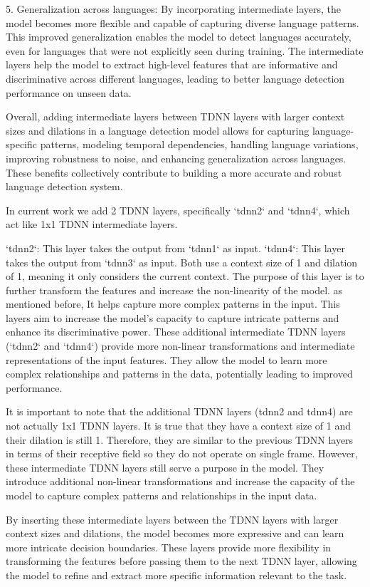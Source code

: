 \documentclass[a4paper]{article}
\begin{document}
5. Generalization across languages: By incorporating intermediate layers, the model becomes more flexible and capable of capturing diverse language patterns. This improved generalization enables the model to detect languages accurately, even for languages that were not explicitly seen during training. The intermediate layers help the model to extract high-level features that are informative and discriminative across different languages, leading to better language detection performance on unseen data.

Overall, adding intermediate layers between TDNN layers with larger context sizes and dilations in a language detection model allows for capturing language-specific patterns, modeling temporal dependencies, handling language variations, improving robustness to noise, and enhancing generalization across languages. These benefits collectively contribute to building a more accurate and robust language detection system.

In current work we add 2 TDNN layers, specifically `tdnn2` and `tdnn4`, which act like 1x1 TDNN intermediate layers.

`tdnn2`: This layer takes the output from `tdnn1` as input. `tdnn4`: This layer takes the output from `tdnn3` as input. Both use a context size of 1 and dilation of 1, meaning it only considers the current context. The purpose of this layer is to further transform the features and increase the non-linearity of the model. as mentioned before, It helps capture more complex patterns in the input. This layers aim to increase the model's capacity to capture intricate patterns and enhance its discriminative power.
These additional intermediate TDNN layers (`tdnn2` and `tdnn4`) provide more non-linear transformations and intermediate representations of the input features. They allow the model to learn more complex relationships and patterns in the data, potentially leading to improved performance.

It is important to note that the additional TDNN layers (tdnn2 and tdnn4) are not actually 1x1 TDNN layers. It is true that they have a context size of 1 and their dilation is still 1. Therefore, they are similar to the previous TDNN layers in terms of their receptive field so they do not operate on single frame. However, these intermediate TDNN layers still serve a purpose in the model. They introduce additional non-linear transformations and increase the capacity of the model to capture complex patterns and relationships in the input data.

By inserting these intermediate layers between the TDNN layers with larger context sizes and dilations, the model becomes more expressive and can learn more intricate decision boundaries. These layers provide more flexibility in transforming the features before passing them to the next TDNN layer, allowing the model to refine and extract more specific information relevant to the task.
\end{document}
